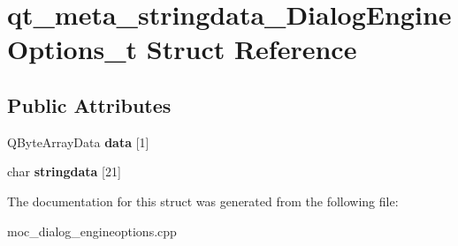 \hypertarget{structqt__meta__stringdata__DialogEngineOptions__t}{\section{qt\-\_\-meta\-\_\-stringdata\-\_\-\-Dialog\-Engine\-Options\-\_\-t Struct Reference}
\label{structqt__meta__stringdata__DialogEngineOptions__t}
}
\subsection*{Public Attributes}
\begin{DoxyCompactItemize}
\item 
\hypertarget{structqt__meta__stringdata__DialogEngineOptions__t_a4ec9e39c3fa6af4c17a088977663ce90}{Q\-Byte\-Array\-Data {\bfseries data} \mbox{[}1\mbox{]}}\label{structqt__meta__stringdata__DialogEngineOptions__t_a4ec9e39c3fa6af4c17a088977663ce90}

\item 
\hypertarget{structqt__meta__stringdata__DialogEngineOptions__t_af10215f09377ffa381c2515f349ab33e}{char {\bfseries stringdata} \mbox{[}21\mbox{]}}\label{structqt__meta__stringdata__DialogEngineOptions__t_af10215f09377ffa381c2515f349ab33e}

\end{DoxyCompactItemize}


The documentation for this struct was generated from the following file\-:\begin{DoxyCompactItemize}
\item 
moc\-\_\-dialog\-\_\-engineoptions.\-cpp\end{DoxyCompactItemize}
